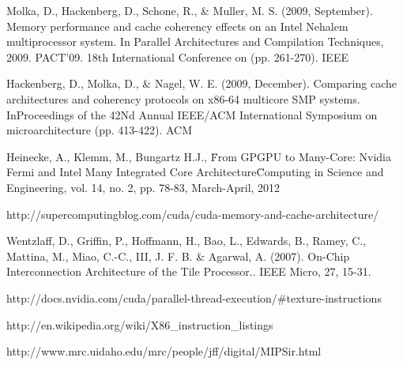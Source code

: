 \begin{thebibliography}{99}
 Molka, D., Hackenberg, D., Schone, R., \& Muller, M. S. (2009, September). Memory performance and cache coherency effects on an Intel Nehalem multiprocessor system. In Parallel Architectures and Compilation Techniques, 2009. PACT'09. 18th International Conference on (pp. 261-270). IEEE

 Hackenberg, D., Molka, D., \& Nagel, W. E. (2009, December). Comparing cache architectures and coherency protocols on x86-64 multicore SMP systems. InProceedings of the 42Nd Annual IEEE/ACM International Symposium on microarchitecture (pp. 413-422). ACM

 Heinecke, A., Klemm, M., Bungartz H.J., \"From GPGPU to Many-Core: Nvidia Fermi and Intel Many Integrated Core Architecture\" Computing in Science and Engineering, vol. 14, no. 2, pp. 78-83, March-April, 2012 

 http://supercomputingblog.com/cuda/cuda-memory-and-cache-architecture/

 Wentzlaff, D., Griffin, P., Hoffmann, H., Bao, L., Edwards, B., Ramey, C., Mattina, M., Miao, C.-C., III, J. F. B. \& Agarwal, A. (2007). On-Chip Interconnection Architecture of the Tile Processor.. IEEE Micro, 27, 15-31. 

 http://docs.nvidia.com/cuda/parallel-thread-execution/\#texture-instructions

 http://en.wikipedia.org/wiki/X86\_instruction\_listings

 http://www.mrc.uidaho.edu/mrc/people/jff/digital/MIPSir.html

\end{thebibliography}